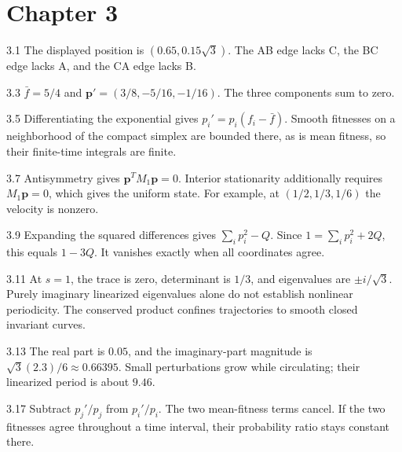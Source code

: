 \documentclass[11pt,oneside,openany]{book}
\theoremstyle{definition}
\theoremstyle{remark}
\newenvironment{answers}{\begin{description}[leftmargin=2.9em,labelwidth=2.5em,labelsep=.4em,itemsep=8pt,font=\normalfont\bfseries]}{\end{description}}
\newcommand{\p}{\mathbf{p}}
\numberwithin{equation}{chapter}
\begin{document}
\section*{Chapter 3}
\begin{answers}
\item[3.1] The displayed position is $(0.65,0.15\sqrt3)$. The AB edge lacks C, the BC edge lacks A, and the CA edge lacks B.
\item[3.3] $\bar f=5/4$ and $\p'=(3/8,-5/16,-1/16)$. The three components sum to zero.
\item[3.5] Differentiating the exponential gives $p_i'=p_i(f_i-\bar f)$. Smooth fitnesses on a neighborhood of the compact simplex are bounded there, as is mean fitness, so their finite-time integrals are finite.
\item[3.7] Antisymmetry gives $\p^TM_1\p=0$. Interior stationarity additionally requires $M_1\p=0$, which gives the uniform state. For example, at $(1/2,1/3,1/6)$ the velocity is nonzero.
\item[3.9] Expanding the squared differences gives $\sum_i p_i^2-Q$. Since $1=\sum_i p_i^2+2Q$, this equals $1-3Q$. It vanishes exactly when all coordinates agree.
\item[3.11] At $s=1$, the trace is zero, determinant is $1/3$, and eigenvalues are $\pm i/\sqrt3$. Purely imaginary linearized eigenvalues alone do not establish nonlinear periodicity. The conserved product confines trajectories to smooth closed invariant curves.
\item[3.13] The real part is $0.05$, and the imaginary-part magnitude is $\sqrt3(2.3)/6\approx0.66395$. Small perturbations grow while circulating; their linearized period is about $9.46$.
\item[3.17] Subtract $p_j'/p_j$ from $p_i'/p_i$. The two mean-fitness terms cancel. If the two fitnesses agree throughout a time interval, their probability ratio stays constant there.
\end{answers}
\end{document}
